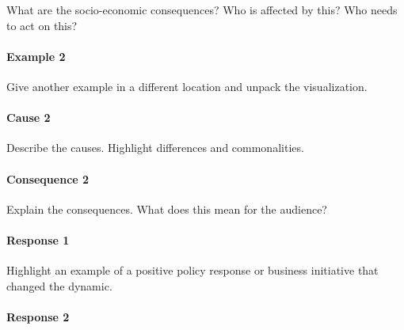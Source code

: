 \documentclass[
]{book}
\renewenvironment{quote}{\begin{VF}}{\end{VF}}
\begin{document}
\begin{quote}
What are the socio-economic consequences? Who is affected by this? Who needs to act on this?
\end{quote}

\hypertarget{example-2}{%
\paragraph*{Example 2}\label{example-2}}

\begin{quote}
Give another example in a different location and unpack the visualization.
\end{quote}

\hypertarget{cause-2}{%
\paragraph*{Cause 2}\label{cause-2}}

\begin{quote}
Describe the causes. Highlight differences and commonalities.
\end{quote}

\hypertarget{consequence-2}{%
\paragraph*{Consequence 2}\label{consequence-2}}

\begin{quote}
Explain the consequences. What does this mean for the audience?
\end{quote}

\hypertarget{response-1}{%
\paragraph*{Response 1}\label{response-1}}

\begin{quote}
Highlight an example of a positive policy response or business initiative that changed the dynamic.
\end{quote}

\hypertarget{response-2}{%
\paragraph*{Response 2}\label{response-2}}
\end{document}

